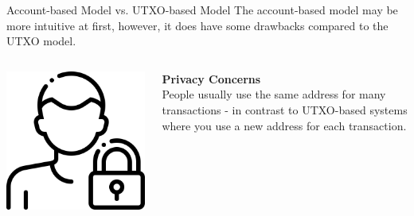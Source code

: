 \documentclass[handout]{beamer}
\begin{document}
\begin{frame}{Account-based Model vs. UTXO-based Model}
	The account-based model may be more intuitive at first, however, it does have some drawbacks compared to the UTXO model. \\ 
	\vspace{2em}
		\begin{columns}[T]
			\begin{column}{0.25\textwidth}
				\center
				\includegraphics[scale=0.1]{../assets/images/privacy.png}
			\end{column}
			\begin{column}{0.8\textwidth}
				\textbf{Privacy Concerns}\\
People usually use the same address for many transactions - in contrast to UTXO-based systems where you use a new address for each transaction. \\
\href{https://etherscan.io/address/0x8cbcb10a365a5e26dfcd41b1257fda54bc604c70}{}
			\end{column}
		\end{columns}	
\end{frame}
\end{document}
